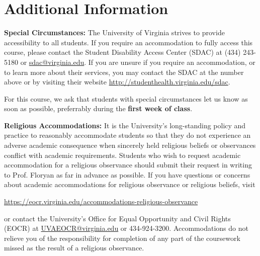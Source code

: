 \documentclass[12pt]{article}
\begin{document}
\section*{Additional Information}


\textbf{Special Circumstances:} The University of Virginia strives to provide accessibility to all students. If you require an accommodation to fully access this course, please contact the Student Disability Access Center (SDAC) at (434) 243-5180 or \url{sdac@virginia.edu}. If you are unsure if you require an accommodation, or to learn more about their services, you may contact the SDAC at the number above or by visiting their website \url{http://studenthealth.virginia.edu/sdac}.

For this course, we ask that students with special circumstances let us know as soon as possible, preferrably during the \textbf{first week of class}.

\textbf{Religious Accommodations:} It is the University's long-standing policy and practice to reasonably accommodate students so that they do not experience an adverse academic consequence when sincerely held religious beliefs or observances conflict with academic requirements.  Students who wish to request academic accommodation for a religious observance should submit their request in writing to Prof. Floryan as far in advance as possible. If you have questions or concerns about academic accommodations for religious observance or religious beliefs, visit 

\begin{center} 
    \url{https://eocr.virginia.edu/accommodations-religious-observance}
\end{center}

or contact the University's Office for Equal Opportunity and Civil Rights (EOCR) at \url{UVAEOCR@virginia.edu} or 434-924-3200.  Accommodations do not relieve you of the responsibility for completion of any part of the coursework missed as the result of a religious observance.
\end{document}
